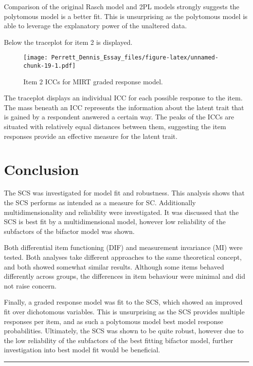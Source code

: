 \documentclass[
  man,floatsintext]{apa6}
\begin{document}
Comparison of the original Rasch model and 2PL models strongly suggests the polytomous model is a better fit. This is unsurprising as the polytomous model is able to leverage the explanatory power of the unaltered data.

Below the traceplot for item 2 is displayed.

\begin{figure}
\centering
\texttt{[image: Perrett\_Dennis\_Essay\_files/figure-latex/unnamed-chunk-19-1.pdf]}
\caption{\label{fig:unnamed-chunk-19}Item 2 ICCs for MIRT graded response model.}
\end{figure}

The traceplot displays an individual ICC for each possible response to the item. The mass beneath an ICC represents the information about the latent trait that is gained by a respondent answered a certain way. The peaks of the ICCs are situated with relatively equal distances between them, suggesting the item responses provide an effective measure for the latent trait.

\hypertarget{conclusion}{%
\section{Conclusion}\label{conclusion}}

The SCS was investigated for model fit and robustness. This analysis shows that the SCS performs as intended as a measure for SC. Additionally multidimensionality and reliability were investigated. It was discussed that the SCS is best fit by a multidimensional model, however low reliability of the subfactors of the bifactor model was shown.

Both differential item functioning (DIF) and measurement invariance (MI) were tested. Both analyses take different approaches to the same theoretical concept, and both showed somewhat similar results. Although some items behaved differently across groups, the differences in item behaviour were minimal and did not raise concern.

Finally, a graded response model was fit to the SCS, which showed an improved fit over dichotomous variables. This is unsurprising as the SCS provides multiple responses per item, and as such a polytomous model best model response probabilities.
Ultimately, the SCS was shown to be quite robust, however due to the low reliability of the subfactors of the best fitting bifactor model, further investigation into best model fit would be beneficial.

\begin{center}\rule{0.5\linewidth}{0.5pt}\end{center}
\end{document}
